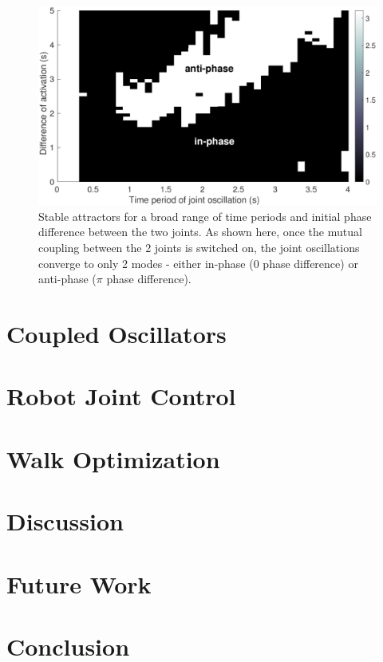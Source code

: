 \documentclass[12pt,twoside]{article}
\theoremstyle{plain}
\theoremstyle{definition}
\theoremstyle{remark}
\begin{document}
\begin{figure}[H]
\centering
\includegraphics[scale=0.55]{figures/5-1-stable-attractors.eps}
\caption{Stable attractors for a broad range of time periods and initial phase difference between the two joints. As shown here, once the mutual coupling between the 2 joints is switched on, the joint oscillations converge to only 2 modes - either in-phase (0 phase difference) or anti-phase ($\pi$ phase difference).}
\label{fig:stable-attractors}
\end{figure}

\section{Coupled Oscillators}

\section{Robot Joint Control}

\section{Walk Optimization}

\section{Discussion}

\section{Future Work}

\section{Conclusion}

\cite{ronsse2009computational, williamson1998neural, matsuoka1987mechanisms, matsuoka1985sustained,Ishiguro2003}

%
%


\end{document}
